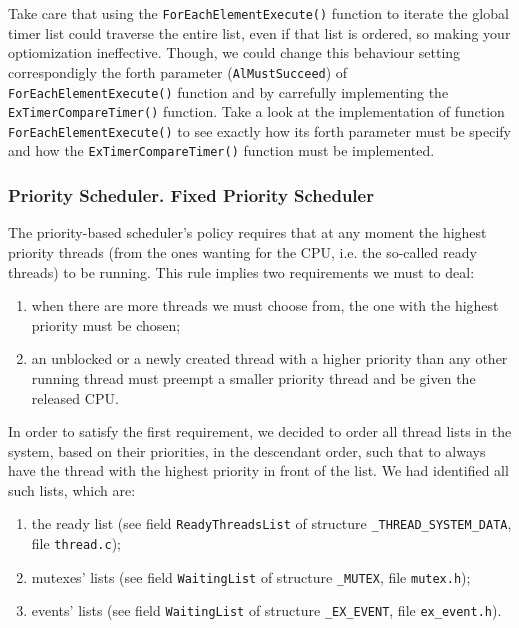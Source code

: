 Take care that using the \lstinline|ForEachElementExecute()| function to iterate the global timer list could traverse the entire list, even if that list is ordered, so making your optiomization ineffective. Though, we could change this behaviour setting correspondigly the forth parameter (\lstinline|AlMustSucceed|) of \lstinline|ForEachElementExecute()| function and by carrefully implementing the \lstinline|ExTimerCompareTimer()| function. Take a look at the implementation of function \lstinline|ForEachElementExecute()| to see exactly how its forth parameter must be specify and how the \lstinline|ExTimerCompareTimer()| function must be implemented. 

\subsubsection{Priority Scheduler. Fixed Priority Scheduler}

The priority-based scheduler's policy requires that at any moment the highest priority threads (from the ones wanting for the CPU, i.e. the so-called ready threads) to be running. This rule implies two requirements we must to deal: 
\begin{enumerate}
    \item when there are more threads we must choose from, the one with the highest priority must be chosen;
    
    \item an unblocked or a newly created thread with a higher priority than any other running thread must preempt a smaller priority thread and be given the released CPU.
\end{enumerate}

In order to satisfy the first requirement, we decided to order all thread lists in the system, based on their priorities, in the descendant order, such that to always have the thread with the highest priority in front of the list. We had identified all such lists, which are:
\begin{enumerate}
    \item the ready list (see field \lstinline|ReadyThreadsList| of structure \lstinline|_THREAD_SYSTEM_DATA|, file \lstinline|thread.c|);
    
    \item mutexes' lists (see field \lstinline|WaitingList| of structure \lstinline|_MUTEX|, file \lstinline|mutex.h|);
    
    \item events' lists (see field \lstinline|WaitingList| of structure \lstinline|_EX_EVENT|, file \lstinline|ex_event.h|).
\end{enumerate}

